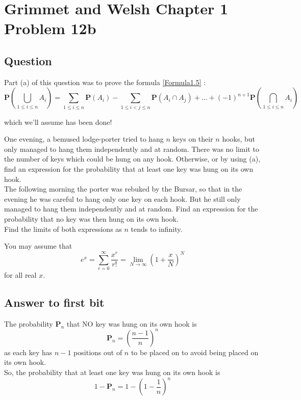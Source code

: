 \section{Grimmet and Welsh Chapter 1 Problem 12b}
\subsection{Question}

Part (a) of this question was to prove the formula \eqref{Formula1.5} : 
\begin{equation} 
\mathbf{P} (\bigcup_{1 \leq i \leq n} A_i) = \sum_{1 \leq i \leq n} \mathbf{P}(A_i) - 
\sum_{1 \leq i < j \leq n} \mathbf{P}(A_i \cap A_j) + \ldots 
+ (-1)^{n+1} \mathbf{P}(\bigcap_{1 \leq i \leq n} A_i) 
\end{equation}

which we'll assume has been done!

One evening, a bemused lodge-porter tried to hang $n$ keys on their $n$ hooks, but only managed to hang them independently and at random. 
There was no limit to the number of keys which could be hung on any hook. Otherwise, or by using (a), find an expression for the probability that at least one key was hung on its own hook.\\
The following morning the porter was rebuked by the Bursar, so that in the evening he was careful to hang only one key on each hook. 
But he still only managed to hang them independently and at random. Find an expression for the probability that no key was then hung on its own hook.\\
Find the limits of both expressions as $n$ tends to infinity.

You may assume that 
\begin{equation} 
e^x = \sum_{r=0}^\infty \frac{x^r}{r!} = \lim_{N\rightarrow \infty} \left(1 + \frac{x}{N}\right)^N
\label{Problem12_1}
\end{equation} 
for all real $x$.

\subsection{Answer to first bit}
The probability $\mathbf{P}_n$ that NO key was hung on its own hook is  
\begin{equation*} 
\mathbf{P}_n = \left(\frac{n-1}{n}\right)^n   
\end{equation*}
as each key has $n-1$ positions out of $n$ to be placed on to avoid being placed on its own hook.\\
So, the probability that at least one key was hung on its own hook is
\begin{equation*} 
1 - \mathbf{P}_n = 1 - \left(1 - \frac{1}{n}\right)^n   
\end{equation*} 

